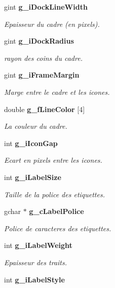 \begin{CompactItemize}
gint {\bf g\_\-iDockLineWidth}
\begin{CompactList}\small\item\em Epaisseur du cadre (en pixels). \item\end{CompactList}\item 
gint {\bf g\_\-iDockRadius}
\begin{CompactList}\small\item\em rayon des coins du cadre. \item\end{CompactList}\item 
gint {\bf g\_\-iFrameMargin}
\begin{CompactList}\small\item\em Marge entre le cadre et les icones. \item\end{CompactList}\item 
double {\bf g\_\-fLineColor} [4]
\begin{CompactList}\small\item\em La couleur du cadre. \item\end{CompactList}\item 
int {\bf g\_\-iIconGap}
\begin{CompactList}\small\item\em Ecart en pixels entre les icones. \item\end{CompactList}\item 
int {\bf g\_\-iLabelSize}
\begin{CompactList}\small\item\em Taille de la police des etiquettes. \item\end{CompactList}\item 
gchar $\ast$ {\bf g\_\-cLabelPolice}
\begin{CompactList}\small\item\em Police de caracteres des etiquettes. \item\end{CompactList}\item 
int {\bf g\_\-iLabelWeight}
\begin{CompactList}\small\item\em Epaisseur des traits. \item\end{CompactList}\item 
int {\bf g\_\-iLabelStyle}

\end{CompactItemize}

